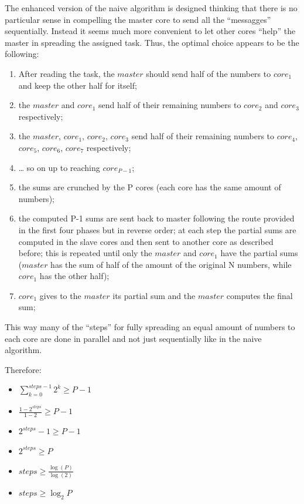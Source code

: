\documentclass[
  10pt,
]{article}
\providecommand{\tightlist}{%
  \setlength{\itemsep}{0pt}\setlength{\parskip}{0pt}}
\begin{document}
The enhanced version of the naive algorithm is designed thinking that
there is no particular sense in compelling the master core to send all
the ``messagges'' sequentially. Instead it seems much more convenient to
let other cores ``help'' the master in spreading the assigned task.
Thus, the optimal choice appears to be the following:

\begin{enumerate}
\def\labelenumi{\arabic{enumi}.}
\tightlist
\item
  After reading the task, the \(master\) should send half of the numbers
  to \(core_1\) and keep the other half for itself;
\item
  the \(master\) and \(core_1\) send half of their remaining numbers to
  \(core_2\) and \(core_3\) respectively;
\item
  the \(master\), \(core_1\), \(core_2\), \(core_3\) send half of their
  remaining numbers to \(core_4\), \(core_5\), \(core_6\), \(core_7\)
  respectively;
\item
  \ldots{} so on up to reaching \(core_{P-1}\);
\item
  the sums are crunched by the P cores (each core has the same amount of
  numbers);
\item
  the computed P-1 sums are sent back to master following the route
  provided in the first four phases but in reverse order; at each step
  the partial sums are computed in the slave cores and then sent to
  another core as described before; this is repeated until only the
  \(master\) and \(core_1\) have the partial sums (\(master\) has the
  sum of half of the amount of the original N numbers, while \(core_1\)
  has the other half);
\item
  \(core_1\) gives to the \(master\) its partial sum and the \(master\)
  computes the final sum;
\end{enumerate}

This way many of the ``steps'' for fully spreading an equal amount of
numbers to each core are done in parallel and not just sequentially like
in the naive algorithm.

Therefore:

\begin{itemize}
\tightlist
\item
  \(\sum_{k=0}^{steps-1} 2^k \geq P-1\)
\item
  \(\frac{1-2^{steps}}{1-2} \geq P-1\)
\item
  \(2^{steps}-1 \geq P-1\)
\item
  \(2^{steps} \geq P\)
\item
  \(steps \geq \frac{\log(P)}{\log(2)}\)
\item
  \(steps \geq \log_2{P}\)
\end{itemize}
\end{document}
